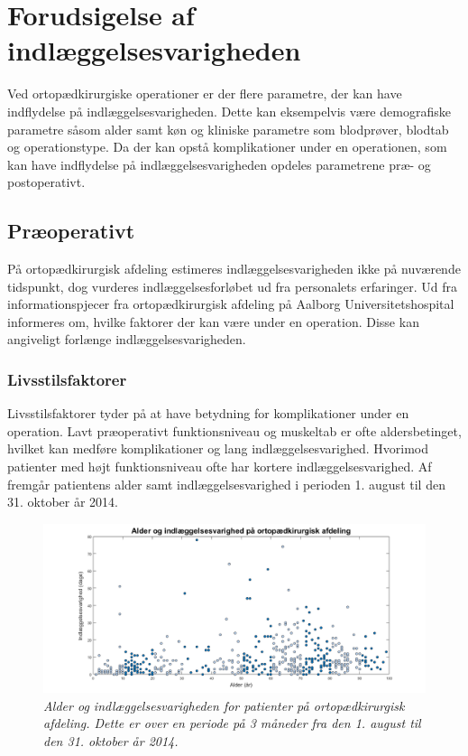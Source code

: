 \section{Forudsigelse af indlæggelsesvarigheden}
Ved ortopædkirurgiske operationer er der flere parametre, der kan have indflydelse på indlæggelsesvarigheden. Dette kan eksempelvis være demografiske parametre såsom alder samt køn og kliniske parametre som blodprøver, blodtab og operationstype. Da der kan opstå komplikationer under en operationen, som kan have indflydelse på indlæggelsesvarigheden opdeles parametrene præ- og postoperativt.


\subsection{Præoperativt}
På ortopædkirurgisk afdeling estimeres indlæggelsesvarigheden ikke på nuværende tidspunkt, dog vurderes indlæggelsesforløbet ud fra personalets erfaringer. Ud fra informationspjecer fra ortopædkirurgisk afdeling på Aalborg Universitetshospital informeres om, hvilke faktorer der kan være under en operation. Disse kan angiveligt forlænge indlæggelsesvarigheden. 


\subsubsection{Livsstilsfaktorer}
Livsstilsfaktorer tyder på at have betydning for komplikationer under en operation. Lavt præoperativt funktionsniveau og muskeltab er ofte aldersbetinget, hvilket kan medføre komplikationer og lang indlæggelsesvarighed. Hvorimod patienter med højt funktionsniveau ofte har kortere indlæggelsesvarighed.\cite{Kehlet2001, Janssen2002} Af  fremgår patientens alder samt indlæggelsesvarighed i perioden 1. august til den 31. oktober år 2014.


\begin{figure}[H]
	\centering
	\includegraphics[scale=0.45]{figures/alderogindlaeg}
	\caption{\textit{Alder og indlæggelsesvarigheden for patienter på ortopædkirurgisk afdeling. Dette er over en periode på 3 måneder fra den 1. august til den 31. oktober år 2014.}}
	\label{alderogindlaeggelse}
\end{figure}


